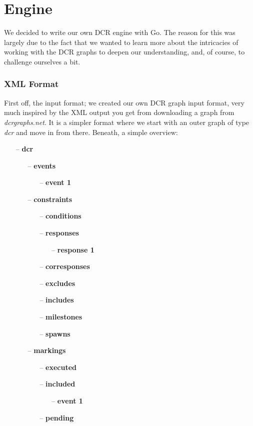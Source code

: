 \section*{Engine}
We decided to write our own DCR engine with Go. The reason for this was largely due to the fact
that we wanted to learn more about the intricacies of working with the DCR graphs to deepen our
understanding, and, of course, to challenge ourselves a bit.

\subsubsection*{XML Format}
First off, the input format; we created our own DCR graph input format, very much inspired by the
XML output you get from downloading a graph from \textit{dcrgraphs.net}.
It is a simpler format where we start with an outer graph of type \textit{dcr} and move in from
there. Beneath, a simple overview:

\begin{itemize}
    \item[--] \textbf{dcr}
    \begin{itemize}
        \item[--] \textbf{events}
        \begin{itemize}
            \item[--] \textbf{event 1}
        \end{itemize}
        \item[--] \textbf{constraints}
        \begin{itemize}
            \item[--] \textbf{conditions}
            \item[--] \textbf{responses}
            \begin{itemize}
                \item[--] \textbf{response 1}
            \end{itemize}
            \item[--] \textbf{corresponses}
            \item[--] \textbf{excludes}
            \item[--] \textbf{includes}
            \item[--] \textbf{milestones}
            \item[--] \textbf{spawns}
        \end{itemize}
        \item[--] \textbf{markings}
        \begin{itemize}
            \item[--] \textbf{executed}
            \item[--] \textbf{included}
            \begin{itemize}
                \item[--] \textbf{event 1}
            \end{itemize}
            \item[--] \textbf{pending}
        \end{itemize}
    \end{itemize}
\end{itemize}

